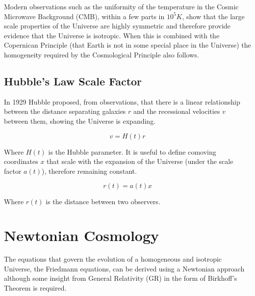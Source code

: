 \documentclass[12pt]{article} %
\begin{document}
Modern observations such as the uniformity of the temperature in the Cosmic Microwave Background (CMB), within a few parts in $10^5 K$, show that the large scale properties of the Universe are highly symmetric and therefore provide evidence that the Universe is isotropic. When this is combined with the Copernican Principle (that Earth is not in some special place in the Universe) the homogeneity required by the Cosmological Principle also follows. %

\subsection{Hubble's Law Scale Factor}

In 1929 Hubble proposed, from observations, that there is a linear relationship between the distance separating galaxies $r$ and the recessional velocities $v$ between them, showing the Universe is expanding.

\begin{equation}\label{hubblelaw}
v = H(t) r
\end{equation}

Where $H(t)$ is the Hubble parameter. It is useful to define comoving coordinates $x$ that scale with the expansion of the Universe (under the scale factor $a(t)$), therefore remaining constant.

\begin{equation}\label{radius}
r(t) = a(t)x
\end{equation}

Where $r(t)$ is the distance between two observers.

\section{Newtonian Cosmology}

The equations that govern the evolution of a homogeneous and isotropic Universe, the Friedmann equations, can be derived using a Newtonian approach although some insight from General Relativity (GR) in the form of Birkhoff's Theorem is required.\\
\end{document}
